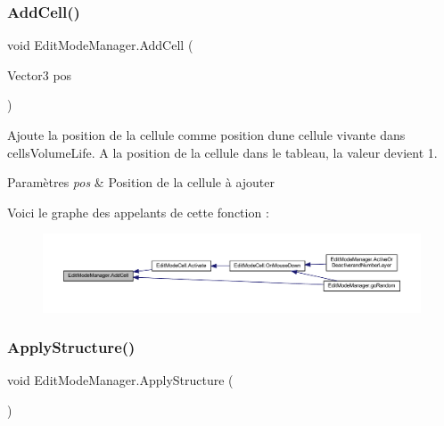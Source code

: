 \subsubsection{\texorpdfstring{Add\+Cell()}{AddCell()}}
{\footnotesize\ttfamily void Edit\+Mode\+Manager.\+Add\+Cell (\begin{DoxyParamCaption}\item[{Vector3}]{pos }\end{DoxyParamCaption})\hspace{0.3cm}{\ttfamily [inline]}}



Ajoute la position de la cellule comme position d\textquotesingle{}une cellule vivante dans cells\+Volume\+Life. A la position de la cellule dans le tableau, la valeur devient 1. 


\begin{DoxyParams}{Paramètres}
{\em pos} & Position de la cellule à ajouter\\
\hline
\end{DoxyParams}
Voici le graphe des appelants de cette fonction \+:
\nopagebreak
\begin{figure}[H]
\begin{center}
\leavevmode
\includegraphics[width=350pt]{class_edit_mode_manager_a9f9fbe57f5bbb6b90dc1dc321d411c54_icgraph}
\end{center}
\end{figure}
\mbox{\label{class_edit_mode_manager_ac1d4e4f292d17b4364054f05ddc13bee}} 
\subsubsection{\texorpdfstring{Apply\+Structure()}{ApplyStructure()}}
{\footnotesize\ttfamily void Edit\+Mode\+Manager.\+Apply\+Structure (\begin{DoxyParamCaption}{ }\end{DoxyParamCaption})\hspace{0.3cm}{\ttfamily [inline]}}




